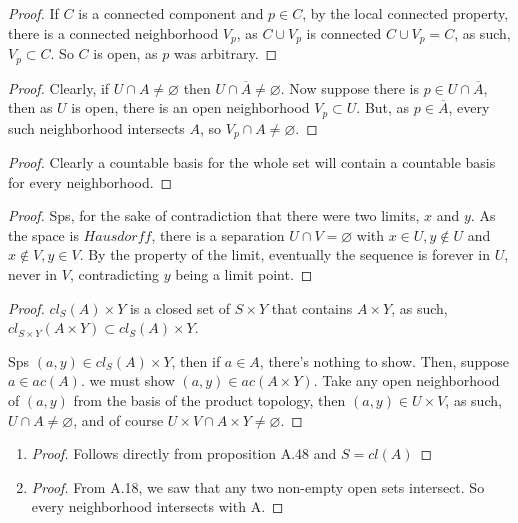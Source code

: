 \prob
\begin{proof}
	If $C$ is a connected component and $p \in C$, by the local connected property, there is a connected neighborhood $V_p$, as $C \cup V_p$ is connected
	$C \cup V_p = C$, as such, $V_p \subset C$. So $C$ is open, as $p$ was arbitrary.
\end{proof}

\prob
\begin{proof}
	Clearly, if $U \cap A \neq \varnothing$ then $U \cap \overline{A} \neq \varnothing$.
	Now suppose there is $p \in U \cap \overline{A}$, then as $U$ is open, there is an open neighborhood $V_p \subset U$. But,
	as $p \in \overline{A}$, every such neighborhood intersects $A$, so $V_p \cap A \neq \varnothing$.
\end{proof}

\prob
\begin{proof}
	Clearly a countable basis for the whole set will contain a countable basis for every neighborhood.
\end{proof}

\prob
\begin{proof}
	Sps, for the sake of contradiction that there were two limits, $x$ and $y$. As the space is $Hausdorff$,
	there is a separation $U \cap V = \varnothing$ with $x \in U, y \not \in U$ and $x \not \in V, y \in V$.
	By the property of the limit, eventually the sequence is forever in $U$, never in $V$, contradicting $y$ being a limit point.
\end{proof}

\prob
\begin{proof}
	$cl_S(A) \times Y$ is a closed set of $S \times Y$ that contains $A \times Y$, as such,
	$cl_{S \times Y}(A \times Y) \subset cl_S(A) \times Y$.

	Sps $(a,y) \in cl_S(A) \times Y$, then if $a \in A$, there's nothing to show. Then, suppose $a \in ac(A)$.
	we must show $(a,y) \in ac(A \times Y)$. Take any open neighborhood of $(a,y)$ from the basis of the product topology,
	then $(a,y) \in U\times V$, as such, $U \cap A \neq \varnothing$, and of course $U\times V \cap A \times Y \neq \varnothing$.
\end{proof}

\prob
\begin{enumerate}[label=(\alph*)]
	\item \begin{proof}
		      Follows directly from proposition A.48 and $S = cl(A)$
	      \end{proof}
	\item \begin{proof}
		      From A.18, we saw that any two non-empty open sets intersect. So every neighborhood intersects with A.
	      \end{proof}
\end{enumerate}
